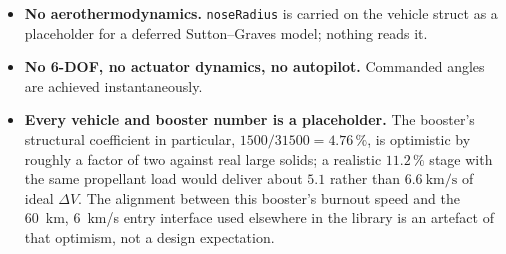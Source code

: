 \documentclass[11pt]{article}
\newcommand{\code}[1]{\texttt{#1}}
\begin{document}
\begin{itemize}
Section~\ref{sec:models} quantifies, not exactly hydrostatic under
inverse-square gravity. Its purpose is closed-form validation, not fidelity.
\item \textbf{No aerothermodynamics.} \code{noseRadius} is carried on the
vehicle struct as a placeholder for a deferred Sutton--Graves model; nothing
reads it.
\item \textbf{No 6-DOF, no actuator dynamics, no autopilot.} Commanded angles
are achieved instantaneously.
\item \textbf{Every vehicle and booster number is a placeholder.} The booster's
structural coefficient in particular, $1500/31500 = 4.76\,\%$, is optimistic by
roughly a factor of two against real large solids; a realistic $11.2\,\%$ stage
with the same propellant load would deliver about $5.1$ rather than
$6.6~\mathrm{km/s}$ of ideal $\Delta V$. The alignment between this booster's
burnout speed and the 60~km, 6~km/s entry interface used elsewhere in the
library is an artefact of that optimism, not a design expectation.
\end{itemize}
\end{document}
